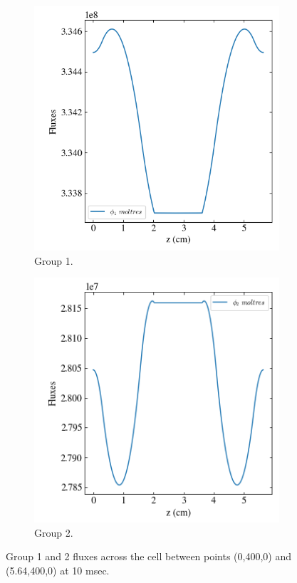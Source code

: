 \documentclass[11pt,letterpaper]{article}
\begin{document}
	\begin{figure}[htbp!]
		\centering
		\begin{subfigure}[t]{0.4\textwidth}
			\centering
			\includegraphics[width=\linewidth]{2D-unitcell-reflec-actionB3}
			\caption{Group 1.}
		\end{subfigure}
		\begin{subfigure}[t]{0.4\textwidth}
			\centering
			\includegraphics[width=\linewidth]{2D-unitcell-reflec-actionB4}
			\caption{Group 2.}
		\end{subfigure}
		\hfill
		\caption{Group 1 and 2 fluxes across the cell between points (0,400,0) and (5.64,400,0) at 10 msec.}
		\label{fig:2D-unitcell-reflecB2}
	\end{figure}
\end{document}
